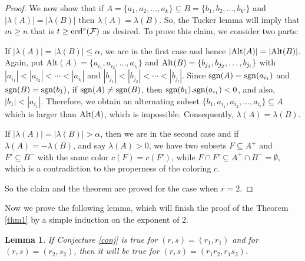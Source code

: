 \documentclass[a4paper,11pt]{article}
\newtheorem{lemma}{Lemma}[section]
\begin{document}
\begin{proof}
We now show that if $A =\{a_1, a_2, \ldots , a_k\}\subseteq B=\{b_1, b_2, \ldots , b_{k'}\}$ and $|\lambda(A)|=|\lambda(B)|$ then $\lambda(A)=\lambda(B)$. So, the Tucker lemma will imply that $m\ge n$ that is $t\ge \mbox{ecd}^s({\cal F})$ as desired. To prove this claim, we consider two parts: 

If $|\lambda (A)|=|\lambda (B)|\leq \alpha$, we are in the first case and hence $|{\rm Alt}(A)|=|{\rm Alt}(B)|$. Again, put $\mbox{Alt}(A)=\{a_{i_1} , a_{i_2} , \ldots , a_{i_l} \}$ and ${\rm Alt} (B)=\{b_{j_1},b_{j_2},\ldots ,b_{j_l}\}$ with  $|a_{i_1}| <|a_{i_2}| < \cdots < |a_{i_l}|$ and $|b_{j_1}|<|b_{j_2}|<\cdots <|b_{j_l}| $.
Since ${\rm sgn} (A) = {\rm sgn} (a_{i_1})$ and ${\rm sgn} (B) = {\rm sgn} (b_{1})$, if
${\rm sgn} (A) \neq {\rm sgn} (B)$, then ${\rm sgn} (b_{1}).{\rm sgn} (a_{i_1}) < 0$, and also, $|b_1| < |a_{i_1}|$. Therefore, we obtain an alternating subset $\{b_1,a_{i_1} , a_{i_2} , \ldots , a_{i_l} \}\subseteq A$ which is larger than ${\rm Alt}(A)$, which is impossible.
Consequently, $\lambda (A) = \lambda (B)$.


If $|\lambda (A)|=|\lambda (B)| > \alpha$, then we are in the second case and if $\lambda(A)=-\lambda(B)$, and say $\lambda(A)>0$, we have two subsets $F\subseteq A^{+}$ and $F'\subseteq B^{-}$ with the same color $c(F)=c(F')$, while $F\cap F'\subseteq A^{+}\cap B^{-}=\emptyset$, which is a contradiction to the properness of the coloring $c$.

So the claim and the theorem are proved for the case when $r=2$.
\end{proof}

Now we prove the following lemma, which will finish the proof of the Theorem \ref{thm1} by a simple induction on the exponent of $2$.
\begin{lemma}\label{lem}
 If Conjecture \ref{conj} is true for $(r,s)=(r_1,r_1)$ and for $(r,s)=(r_2,s_2)$, then it will be true for $(r,s)=(r_1r_2,r_1s_2)$.
 \end{lemma}
\end{document}
